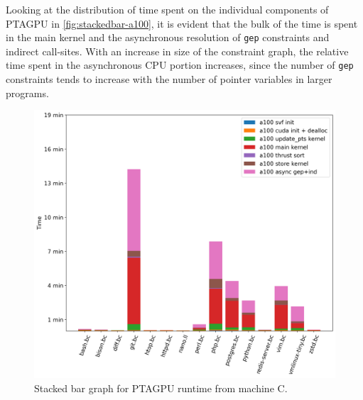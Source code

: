 Looking at the distribution of time spent on the individual components of PTAGPU in \autoref{fig:stackedbar-a100}, it is evident that the bulk of the time is spent in the main kernel and the asynchronous resolution of \verb|gep| constraints and indirect call-sites. With an increase in size of the constraint graph, the relative time spent in the asynchronous CPU portion increases, since the number of \verb|gep| constraints tends to increase with the number of pointer variables in larger programs.
\begin{figure}
    \centering
    \includegraphics[width=.9\textwidth]{img/stackedbar-a100.png}
    \caption{Stacked bar graph for PTAGPU runtime from machine C.}
    \label{fig:stackedbar-a100}
\end{figure}

